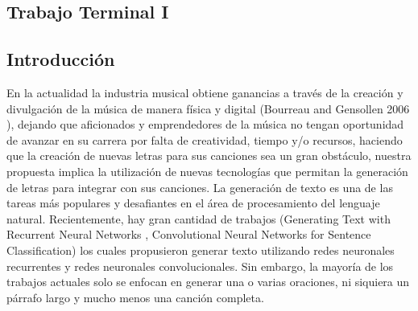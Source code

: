 \documentclass[12pt, a4paper, titlepage]{report}
\begin{document}
	\begin{appendix}
		\renewcommand*\contentsname{{\textcolor{azulescom}{Índice.}}}
		\tableofcontents
		\newpage
		\renewcommand*\listfigurename{{\textcolor{azulescom}{Índice de figuras.}}}
		\listoffigures
		\newpage
		\newpage
		\renewcommand*\listtablename{{\textcolor{azulescom}{Índice de cuadros.}}}
		\listoftables
		
		\newpage
		\renewcommand*\glossaryname{{\textcolor{azulescom}{Glosario.}}}
		
		\printglossary
	\end{appendix}
	
   \textcolor{guindapoli}{\part{Trabajo Terminal I}}
    
    \renewcommand\thechapter{\arabic{chapter}}
    \renewcommand{\appendixname}{Capítulo}
    \renewcommand{\lstlistingname}{C\'odigo}
    \renewcommand{\thepart}{}
    \renewcommand{\partname}{}
    \chapter{\textcolor{azulescom}{Introducción}}
    
    En la actualidad la industria musical obtiene ganancias a través de la creación y divulgación de la música  de
    manera física y digital (Bourreau and Gensollen 2006 \cite{Bourreau_and_Gensollen}), dejando que aficionados y emprendedores de la
    música no tengan oportunidad de avanzar en su carrera por falta de creatividad, tiempo y/o recursos, haciendo que la creación de nuevas letras para sus canciones sea un gran obstáculo, nuestra propuesta implica la utilización de nuevas tecnologías que permitan la generación de letras para integrar con sus canciones. La generación de texto es una de las tareas más populares y desafiantes en el área de procesamiento del lenguaje natural. Recientemente, hay gran cantidad de trabajos (Generating Text with Recurrent Neural Networks \cite{Generating_Text_with_RNN}, Convolutional Neural Networks for Sentence Classification\cite{CNN_for_Sentence_Classification}) los cuales propusieron generar texto utilizando redes neuronales recurrentes y redes neuronales convolucionales. Sin embargo, la mayoría de los trabajos actuales solo se enfocan en generar una o varias oraciones, ni siquiera un párrafo largo y mucho menos una canción completa.\par
    
\end{document}
